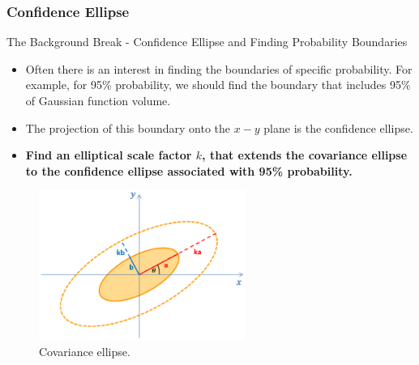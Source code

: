 \subsubsection{Confidence Ellipse}
\begin{frame}{The Background Break - Confidence Ellipse and Finding Probability Boundaries}

\begin{itemize}
    \item Often there is an interest in finding the boundaries of specific probability. For example, for 95\% probability, we should find the boundary that includes 95\% of Gaussian function volume.
    \item The projection of this boundary onto the \(x - y\) plane is the confidence ellipse. 
    \item \textbf{Find an elliptical scale factor \(k\), that extends the covariance ellipse to the confidence ellipse associated with 95\% probability.}
    \end{itemize}
    \begin{figure}
        \centering
        \includegraphics[width=0.6\textwidth]{Figures/Background2/ConfidenceEllipse.png}
        \vspace{-10pt}
        \caption{Covariance ellipse.}
    \end{figure}
\end{frame}
